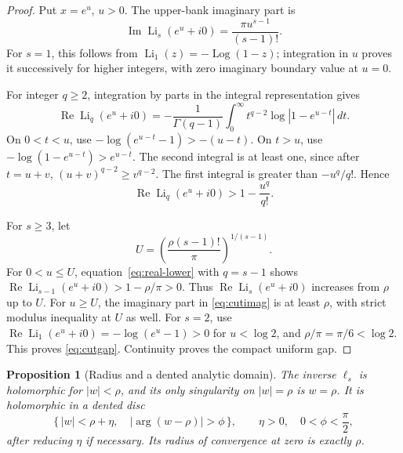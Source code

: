 \documentclass[11pt,a4paper]{article}
\numberwithin{equation}{section}
\newtheorem{proposition}[theorem]{Proposition}
\theoremstyle{definition}
\theoremstyle{remark}
\DeclareMathOperator{\Li}{Li}
\DeclareMathOperator{\Log}{Log}
\DeclareMathOperator{\Rea}{Re}
\DeclareMathOperator{\Ima}{Im}
\newcommand{\dd}{\,d}
\newcommand{\LiInv}{\ell}
\begin{document}
\begin{proof}
Put \(x=e^u\), \(u>0\).
The upper-bank imaginary part is
\begin{equation}
 \Ima\Li_s(e^u+i0)=\frac{\pi u^{s-1}}{(s-1)!}.
 \label{eq:cutimag}
\end{equation}
For \(s=1\), this follows from
\(\Li_1(z)=-\Log(1-z)\); integration in \(u\) proves it successively
for higher integers, with zero imaginary boundary value at \(u=0\).

For integer \(q\ge2\), integration by parts in the integral
representation gives
\[
 \Rea\Li_q(e^u+i0)
 =-\frac1{\Gamma(q-1)}
 \int_0^\infty t^{q-2}\log|1-e^{u-t}|\dd t.
\]
On \(0<t<u\), use
\(-\log(e^{u-t}-1)>-(u-t)\).
On \(t>u\), use
\(-\log(1-e^{u-t})>e^{u-t}\).
The second integral is at least one, since after \(t=u+v\),
\((u+v)^{q-2}\ge v^{q-2}\).
The first integral is greater than \(-u^q/q!\).  Hence
\begin{equation}
 \Rea\Li_q(e^u+i0)>1-\frac{u^q}{q!}.
 \label{eq:real-lower}
\end{equation}

For \(s\ge3\), let
\[
 U=\left(\frac{\rho(s-1)!}{\pi}\right)^{1/(s-1)}.
\]
For \(0<u\le U\), equation~\eqref{eq:real-lower} with \(q=s-1\)
shows \(\Rea\Li_{s-1}(e^u+i0)>1-\rho/\pi>0\).
Thus \(\Rea\Li_s(e^u+i0)\) increases from \(\rho\) up to \(U\).
For \(u\ge U\), the imaginary part in \eqref{eq:cutimag} is at least
\(\rho\), with strict modulus inequality at \(U\) as well.
For \(s=2\), use
\(\Rea\Li_1(e^u+i0)=-\log(e^u-1)>0\) for \(u<\log2\), and
\(\rho/\pi=\pi/6<\log2\).
This proves \eqref{eq:cutgap}.  Continuity proves the compact uniform gap.
\end{proof}

\begin{proposition}[Radius and a dented analytic domain]
\label{prop:delta}
The inverse \(\LiInv_s\) is holomorphic for \(|w|<\rho\), and its
only singularity on \(|w|=\rho\) is \(w=\rho\).
It is holomorphic in a dented disc
\begin{equation}
 \{\,|w|<\rho+\eta,\quad
        |\arg(w-\rho)|>\phi\,\},
 \qquad \eta>0,\quad 0<\phi<\frac{\pi}{2},
 \label{eq:deltadomain}
\end{equation}
after reducing \(\eta\) if necessary.
Its radius of convergence at zero is exactly \(\rho\).
\end{proposition}
\end{document}
